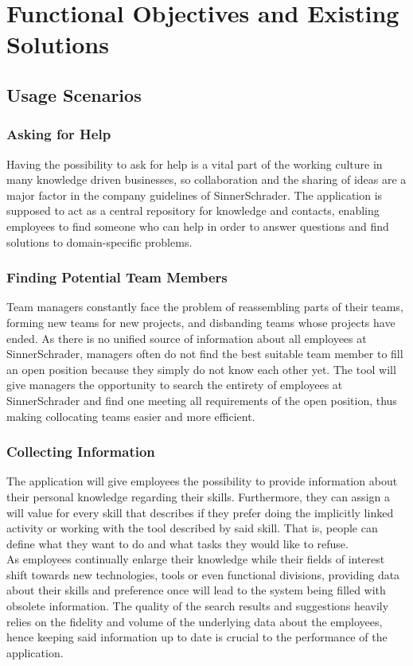 \chapter{Functional Objectives and Existing Solutions}

\section{Usage Scenarios}
\subsection{Asking for Help}
Having the possibility to ask for help is a vital part of the working culture in many knowledge driven
businesses, so collaboration and the sharing of ideas are a major factor in the company guidelines
of SinnerSchrader. The application is supposed to act as a central repository for knowledge and contacts,
enabling employees to find someone who can help in order to answer questions and find solutions to domain-specific problems.

\subsection{Finding Potential Team Members}
Team managers constantly face the problem of reassembling parts of their teams, forming new teams for new projects, and
disbanding teams whose projects have ended. As there is no unified source of information about all employees at SinnerSchrader, managers often
do not find the best suitable team member to fill an open position because they simply do not know each other yet.
The tool will give managers the opportunity to search the entirety of employees at SinnerSchrader and find one
meeting all requirements of the open position, thus making collocating teams easier and more efficient.

\subsection{Collecting Information}
The application will give employees the possibility to provide information about their personal knowledge regarding their skills.
Furthermore, they can assign a will value for every skill that describes if they prefer
doing the implicitly linked activity or working with the tool described by said skill. That is, people can define what they want to do and what tasks they would like to refuse.\\
As employees continually enlarge their knowledge while their fields of interest shift towards new technologies, tools or even
functional divisions, providing data about their skills and preference once will lead to the system being filled with obsolete
information. The quality of the search results and suggestions heavily relies on the fidelity and volume of the underlying data about the employees, hence keeping said information up to date is crucial to the performance of the application.

